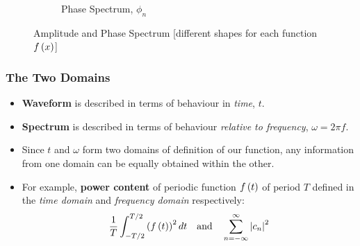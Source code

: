 \begin{figure}[h]
\begin{subfigure}[t]{0.45\textwidth}
    \caption{Phase Spectrum, $\phi_n$}
    \label{fig:1.1.b}
    \end{subfigure}
    \caption{Amplitude and Phase Spectrum [different shapes for each function $f\left(x\right)$]}
    \label{fig:1.1}
\end{figure}
\subsubsection{The Two Domains}
\begin{itemize}
    \item \textbf{Waveform} is described in terms of behaviour in \textit{time}, $t$.
    \item \textbf{Spectrum} is described in terms of behaviour \textit{relative to frequency}, $\omega=2\pi f$.
    \item Since $t$ and $\omega$ form two domains of definition of our function, any information from one domain can be equally obtained within the other.
    \item For example, \textbf{power content} of periodic function $f\left(t\right)$ of period $T$ defined in the \textit{time domain} and \textit{frequency domain} respectively:
    \begin{equation}
        \frac{1}{T}\int_{-T/2}^{T/2}\left(f\left(t\right)\right)^2dt\quad\text{and}\quad\sum_{n=-\infty}^{\infty}\left|c_n\right|^2
    \end{equation}
\end{itemize}
